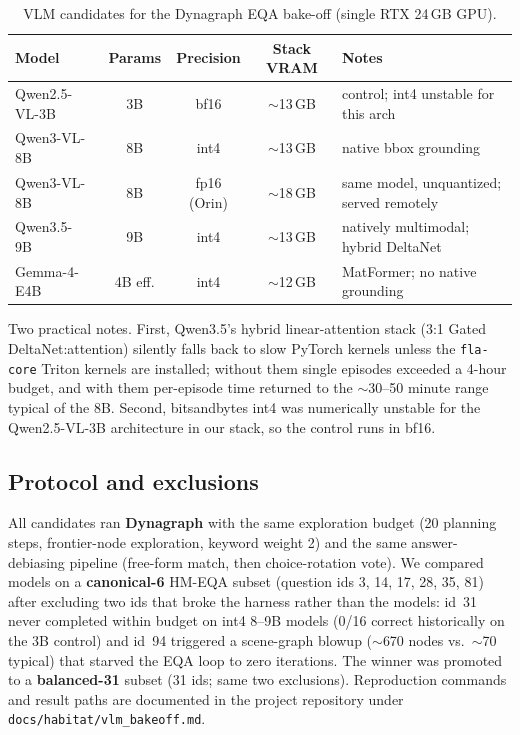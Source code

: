 \begin{table}[h]
  \centering
  \caption{VLM candidates for the Dynagraph EQA bake-off (single RTX 24\,GB GPU).}
  \label{tab:vlm_candidates}
  \small
  \begin{tabular}{@{}lcccl@{}}
    \toprule
    Model & Params & Precision & Stack VRAM & Notes \\
    \midrule
    Qwen2.5-VL-3B~\citep{qwen25vl} & 3B & bf16 & $\sim$13\,GB & control; int4 unstable for this arch \\
    Qwen3-VL-8B~\citep{qwen3vl} & 8B & int4 & $\sim$13\,GB & native bbox grounding \\
    Qwen3-VL-8B~\citep{qwen3vl} & 8B & fp16 (Orin) & $\sim$18\,GB & same model, unquantized; served remotely \\
    Qwen3.5-9B~\citep{qwen35} & 9B & int4 & $\sim$13\,GB & natively multimodal; hybrid DeltaNet \\
    Gemma-4-E4B~\citep{gemma4} & 4B eff. & int4 & $\sim$12\,GB & MatFormer; no native grounding \\
    \bottomrule
  \end{tabular}
\end{table}

Two practical notes. First, Qwen3.5's hybrid linear-attention stack (3:1 Gated
DeltaNet:attention) silently falls back to slow PyTorch kernels unless the
\texttt{fla-core} Triton kernels are installed; without them single episodes exceeded a
4-hour budget, and with them per-episode time returned to the $\sim$30--50 minute range
typical of the 8B. Second, bitsandbytes int4 was numerically unstable for the
Qwen2.5-VL-3B architecture in our stack, so the control runs in bf16.

\subsection{Protocol and exclusions}

All candidates ran \textbf{Dynagraph} with the same exploration budget
(20 planning steps, frontier-node exploration, keyword weight 2) and the same
answer-debiasing pipeline (free-form match, then choice-rotation vote). We compared models
on a \textbf{canonical-6} HM-EQA subset (question ids 3, 14, 17, 28, 35, 81) after excluding
two ids that broke the harness rather than the models: id~31 never completed within
budget on int4 8--9B models (0/16 correct historically on the 3B control) and id~94
triggered a scene-graph blowup ($\sim$670 nodes vs.\ $\sim$70 typical) that starved the
EQA loop to zero iterations. The winner was promoted to a \textbf{balanced-31} subset (31 ids;
same two exclusions). Reproduction commands and result paths are documented in the project
repository under \texttt{docs/habitat/vlm\_bakeoff.md}.

